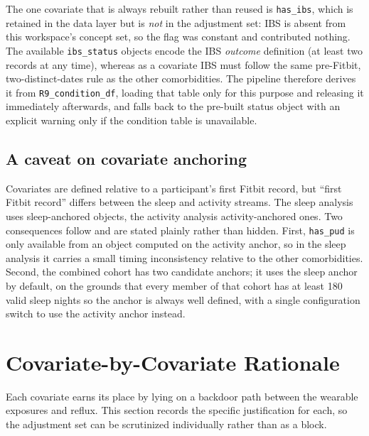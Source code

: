\documentclass[11pt]{article}
\newcommand{\code}[1]{\texttt{\small #1}}
\begin{document}
The one covariate that is always rebuilt rather than reused is \code{has_ibs}, which is retained in
the data layer but is \emph{not} in the adjustment set: IBS is absent from this workspace's concept
set, so the flag was constant and contributed nothing. The available
\code{ibs_status} objects encode the IBS \emph{outcome} definition (at least two records at any time),
whereas as a covariate IBS must follow the same pre-Fitbit, two-distinct-dates rule as the other
comorbidities. The pipeline therefore derives it from \code{R9_condition_df}, loading that table only
for this purpose and releasing it immediately afterwards, and falls back to the pre-built status
object with an explicit warning only if the condition table is unavailable.

\subsection{A caveat on covariate anchoring}
Covariates are defined relative to a participant's first Fitbit record, but ``first Fitbit record''
differs between the sleep and activity streams. The sleep analysis uses sleep-anchored objects, the
activity analysis activity-anchored ones. Two consequences follow and are stated plainly rather than
hidden. First, \code{has_pud} is only available from an object computed on the activity anchor, so in
the sleep analysis it carries a small timing inconsistency relative to the other comorbidities.
Second, the combined cohort has two candidate anchors; it uses the sleep anchor by default, on the
grounds that every member of that cohort has at least 180 valid sleep nights so the anchor is always
well defined, with a single configuration switch to use the activity anchor instead.

\section{Covariate-by-Covariate Rationale}
Each covariate earns its place by lying on a backdoor path between the wearable exposures and reflux.
This section records the specific justification for each, so the adjustment set can be scrutinized
individually rather than as a block.
\end{document}
